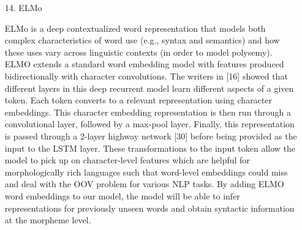 \documentclass[conference]{IEEEtran}
\begin{document}
\begin{enumerate}
\begin{enumerate}
        \item[14.]ELMo \cite{devlin2018bert}
        \item[]ELMo is a deep contextualized word representation that models both complex characteristics of word use (e.g., syntax and semantics) and how these uses vary across linguistic contexts (in order to model polysemy). ELMO extends a standard word embedding model with features produced bidirectionally with character convolutions. The writers in [16] showed that different layers in this deep recurrent model learn different aspects of a given token. Each token converts to a relevant representation using character embeddings. This character embedding representation is then run through a convolutional layer, followed by a max-pool layer. Finally, this representation is passed through a 2-layer highway network [30] before being provided as the input to the LSTM layer. These transformations to the input token allow the model to pick up on character-level features which are helpful for morphologically rich languages such that word-level embeddings could miss and deal with the OOV problem for various NLP tasks. By adding ELMO word embeddings to our model, the model will be able to infer representations for previously unseen words and obtain syntactic information at the morpheme level. \\
        
    \end{enumerate}
\end{enumerate}
\end{document}
